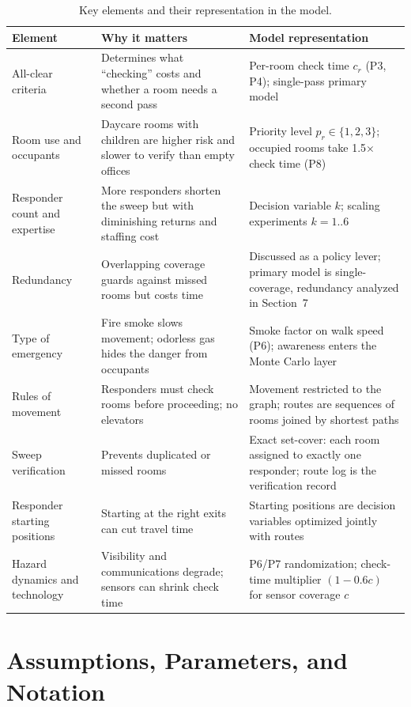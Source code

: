\documentclass{mcmthesis}
\begin{document}
\begin{table}[H]
\centering
\small
\caption{Key elements and their representation in the model.}
\label{tab:elements}
\begin{tabularx}{\textwidth}{lXl}
\toprule
Element & Why it matters & Model representation \\ \midrule
All-clear criteria & Determines what ``checking'' costs and whether a room needs a second pass & Per-room check time $c_r$ (P3, P4); single-pass primary model \\
Room use and occupants & Daycare rooms with children are higher risk and slower to verify than empty offices & Priority level $p_r \in \{1,2,3\}$; occupied rooms take 1.5$\times$ check time (P8) \\
Responder count and expertise & More responders shorten the sweep but with diminishing returns and staffing cost & Decision variable $k$; scaling experiments $k=1..6$ \\
Redundancy & Overlapping coverage guards against missed rooms but costs time & Discussed as a policy lever; primary model is single-coverage, redundancy analyzed in Section~7 \\
Type of emergency & Fire smoke slows movement; odorless gas hides the danger from occupants & Smoke factor on walk speed (P6); awareness enters the Monte Carlo layer \\
Rules of movement & Responders must check rooms before proceeding; no elevators & Movement restricted to the graph; routes are sequences of rooms joined by shortest paths \\
Sweep verification & Prevents duplicated or missed rooms & Exact set-cover: each room assigned to exactly one responder; route log is the verification record \\
Responder starting positions & Starting at the right exits can cut travel time & Starting positions are decision variables optimized jointly with routes \\
Hazard dynamics and technology & Visibility and communications degrade; sensors can shrink check time & P6/P7 randomization; check-time multiplier $(1-0.6c)$ for sensor coverage $c$ \\
\bottomrule
\end{tabularx}
\end{table}

\section{Assumptions, Parameters, and Notation}
\end{document}
